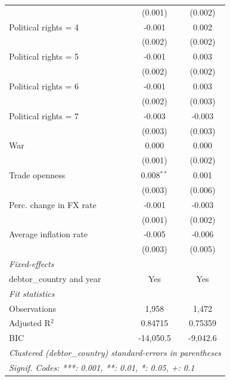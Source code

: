 \begin{table}[htbp]
\begin{tabular}{lcc}
                                 & (0.001)                        & (0.002)\\   
      Political rights = 4       & -0.001                         & 0.002\\   
                                 & (0.002)                        & (0.002)\\   
      Political rights = 5       & -0.001                         & 0.003\\   
                                 & (0.002)                        & (0.002)\\   
      Political rights = 6       & -0.001                         & 0.003\\   
                                 & (0.002)                        & (0.003)\\   
      Political rights = 7       & -0.003                         & -0.003\\   
                                 & (0.003)                        & (0.003)\\   
      War                        & 0.000                          & 0.000\\   
                                 & (0.001)                        & (0.002)\\   
      Trade openness             & 0.008$^{**}$                   & 0.001\\   
                                 & (0.003)                        & (0.006)\\   
      Perc. change in FX rate    & -0.001                         & -0.003\\   
                                 & (0.001)                        & (0.002)\\   
      Average inflation rate     & -0.005                         & -0.006\\   
                                 & (0.003)                        & (0.005)\\   
      \midrule
      \emph{Fixed-effects}\\
      debtor\_country and year   & Yes                            & Yes\\  
      \midrule
      \emph{Fit statistics}\\
      Observations               & 1,958                          & 1,472\\  
      Adjusted R$^2$             & 0.84715                        & 0.75359\\  
      BIC                        & -14,050.5                      & -9,042.6\\  
      \midrule \midrule
      \multicolumn{3}{l}{\emph{Clustered (debtor\_country) standard-errors in parentheses}}\\
      \multicolumn{3}{l}{\emph{Signif. Codes: ***: 0.001, **: 0.01, *: 0.05, +: 0.1}}\\
   \end{tabular}
\end{table}


